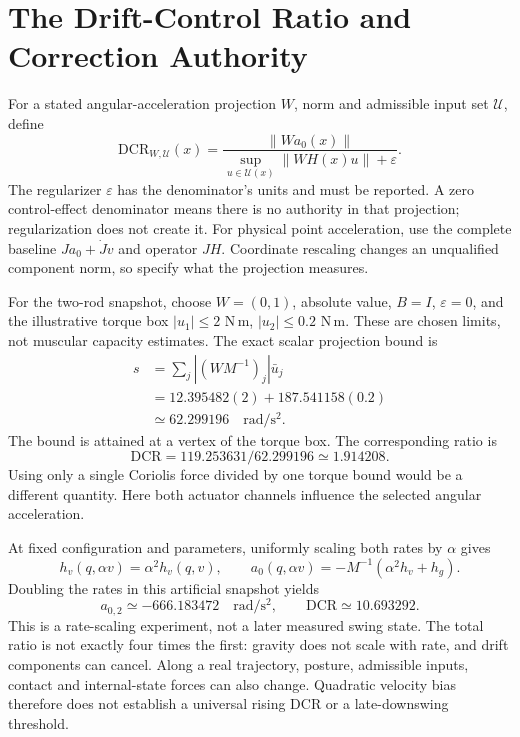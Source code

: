 \section{The Drift-Control Ratio and Correction Authority}
\label{sec:dcr_blowup}

For a stated angular-acceleration projection $W$, norm and admissible input set $\mathcal U$, define
\begin{equation}
\mathrm{DCR}_{W,\mathcal U}(x)=
\frac{\|Wa_0(x)\|}{\sup_{u\in\mathcal U(x)}\|WH(x)u\|+\varepsilon}.
\label{eq:dcr_definition}
\end{equation}
The regularizer $\varepsilon$ has the denominator's units and must be reported. A zero control-effect denominator means there is no authority in that projection; regularization does not create it. For physical point acceleration, use the complete baseline $Ja_0+\dot Jv$ and operator $JH$. Coordinate rescaling changes an unqualified component norm, so specify what the projection measures.

For the two-rod snapshot, choose $W=(0,1)$, absolute value, $B=I$, $\varepsilon=0$, and the illustrative torque box $|u_1|\le2$ N\,m, $|u_2|\le0.2$ N\,m. These are chosen limits, not muscular capacity estimates. The exact scalar projection bound is
\begin{equation}
\begin{aligned}
s&=\sum_j |(WM^{-1})_j|\bar u_j\\
&=12.395482(2)+187.541158(0.2)\\
&\simeq62.299196\quad\mathrm{rad/s^2}.
\end{aligned}
\label{eq:dcr_example_coriolis}
\end{equation}
The bound is attained at a vertex of the torque box. The corresponding ratio is
\begin{equation}
\mathrm{DCR}=119.253631/62.299196\simeq1.914208.
\label{eq:dcr_example_ratio}
\end{equation}
Using only a single Coriolis force divided by one torque bound would be a different quantity. Here both actuator channels influence the selected angular acceleration.

At fixed configuration and parameters, uniformly scaling both rates by $\alpha$ gives
\begin{equation}
h_v(q,\alpha v)=\alpha^2 h_v(q,v),\qquad
a_0(q,\alpha v)=-M^{-1}(\alpha^2h_v+h_g).
\label{eq:dcr_example_late_coriolis}
\end{equation}
Doubling the rates in this artificial snapshot yields
\begin{equation}
a_{0,2}\simeq-666.183472\quad\mathrm{rad/s^2},\qquad
\mathrm{DCR}\simeq10.693292.
\label{eq:dcr_example_late_ratio}
\end{equation}
This is a rate-scaling experiment, not a later measured swing state. The total ratio is not exactly four times the first: gravity does not scale with rate, and drift components can cancel. Along a real trajectory, posture, admissible inputs, contact and internal-state forces can also change. Quadratic velocity bias therefore does not establish a universal rising DCR or a late-downswing threshold.

